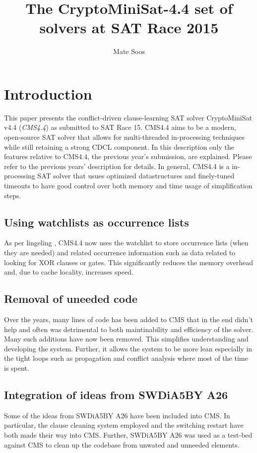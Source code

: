 \documentclass[final]{ieee}
\begin{document}
\title{The CryptoMiniSat-4.4 set of solvers at SAT Race 2015}
\author{Mate Soos}

\maketitle
\thispagestyle{empty}
\pagestyle{empty}

\section{Introduction}
This paper presents the conflict-driven clause-learning SAT solver CryptoMiniSat v4.4 (\emph{CMS4.4}) as submitted to SAT Race 15. CMS4.4 aims to be a modern, open-source SAT solver that allows for multi-threaded in-processing techniques while still retaining a strong CDCL component. In this description only the features relative to CMS4.4, the previous year's submission, are explained. Please refer to the previous years' description for details. In general, CMS4.4 is a in-processing SAT solver that usues optimized datastructures and finely-tuned timeouts to have good control over both memory and time usage of simplification steps.

\subsection{Using watchlists as occurrence lists}
As per lingeling \cite{lingeling}, CMS4.4 now uses the watchlist to store occurrence lists (when they are needed) and related occurrence information such as data related to looking for XOR clauses or gates. This significantly reduces the memory overhead and, due to cache locality, increases speed.

\subsection{Removal of uneeded code}
Over the years, many lines of code has been added to CMS that in the end didn't help and often was detrimental to both maintinability and efficiency of the solver. Many such additions have now been removed. This simplifies understanding and developing the system. Further, it allows the system to be more lean especially in the tight loops such as propagation and conflict analysis where most of the time is spent.

\subsection{Integration of ideas from SWDiA5BY A26}
Some of the ideas from SWDiA5BY A26\cite{swdia} have been included into CMS. In particular, the clause cleaning system employed and the switching restart have both made their way into CMS. Further, SWDiA5BY A26 was used as a test-bed against CMS to clean up the codebase from unwated and unneeded elements.
\end{document}
